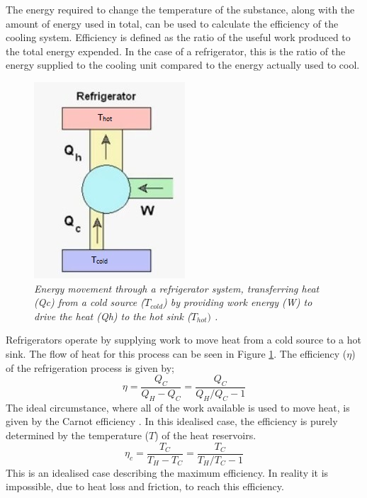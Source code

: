 \documentclass[10pt]{article}
\begin{document}
The energy required to change the temperature of the substance, along with the amount of energy used in total, can be used to calculate the efficiency of the cooling system. Efficiency is defined as the ratio of the useful work produced to the total energy expended. In the case of a refrigerator, this is the ratio of the energy supplied to the cooling unit compared to the energy actually used to cool.\\

\begin{figure}[h!]
    \centering
    \includegraphics[scale=.75]{ref.jpg}
    \caption{\it{Energy movement through a refrigerator system, transferring heat (Qc) from a cold source ($T_{cold}$) by providing work energy (W) to drive the heat (Qh) to the hot sink ($T_{hot})$ \cite{fridge}.}}
    \label{fig:fridge}
\end{figure}

Refrigerators operate by supplying work to move heat from a cold source to a hot sink. The flow of heat for this process can be seen in Figure \ref{fig:fridge}. The efficiency ($\eta$) of the refrigeration process is given by;
\begin{equation}\label{eq:eff}
    \eta = \frac{Q_C}{Q_H-Q_C}=\frac{Q_C}{Q_H/Q_C - 1}
\end{equation}
The ideal circumstance, where all of the work available is used to move heat, is given by the Carnot efficiency \cite{carnot}. In this idealised case, the efficiency is purely determined by the temperature ($T$) of the heat reservoirs.
\begin{equation}\label{eq:carn_eff}
        \eta_c = \frac{T_C}{T_H-T_C}=\frac{T_C}{T_H/T_C - 1}
\end{equation}
This is an idealised case describing the maximum efficiency. In reality it is impossible, due to heat loss and friction, to reach this efficiency. 
\end{document}
